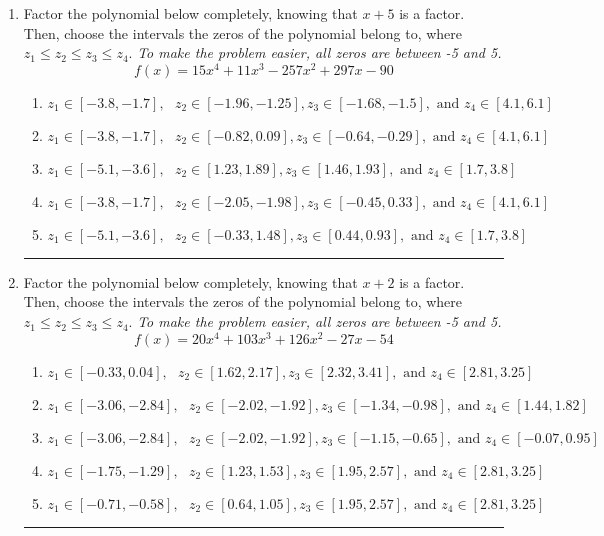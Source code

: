 \documentclass[14pt]{extbook}
\newcommand{\litem}[1]{\item#1\hspace*{-1cm}\rule{\textwidth}{0.4pt}}
\begin{document}
\begin{enumerate}
{\begin{enumerate}[label=\Alph*.]
\end{enumerate} }
\litem{
Factor the polynomial below completely, knowing that $x + 5$ is a factor. Then, choose the intervals the zeros of the polynomial belong to, where $z_1 \leq z_2 \leq z_3 \leq z_4$. \textit{To make the problem easier, all zeros are between -5 and 5.}\[ f(x) = 15x^{4} +11 x^{3} -257 x^{2} +297 x -90 \]\begin{enumerate}[label=\Alph*.]
\item \( z_1 \in [-3.8, -1.7], \text{   }  z_2 \in [-1.96, -1.25], z_3 \in [-1.68, -1.5], \text{   and   } z_4 \in [4.1, 6.1] \)
\item \( z_1 \in [-3.8, -1.7], \text{   }  z_2 \in [-0.82, 0.09], z_3 \in [-0.64, -0.29], \text{   and   } z_4 \in [4.1, 6.1] \)
\item \( z_1 \in [-5.1, -3.6], \text{   }  z_2 \in [1.23, 1.89], z_3 \in [1.46, 1.93], \text{   and   } z_4 \in [1.7, 3.8] \)
\item \( z_1 \in [-3.8, -1.7], \text{   }  z_2 \in [-2.05, -1.98], z_3 \in [-0.45, 0.33], \text{   and   } z_4 \in [4.1, 6.1] \)
\item \( z_1 \in [-5.1, -3.6], \text{   }  z_2 \in [-0.33, 1.48], z_3 \in [0.44, 0.93], \text{   and   } z_4 \in [1.7, 3.8] \)

\end{enumerate} }
\litem{
Factor the polynomial below completely, knowing that $x + 2$ is a factor. Then, choose the intervals the zeros of the polynomial belong to, where $z_1 \leq z_2 \leq z_3 \leq z_4$. \textit{To make the problem easier, all zeros are between -5 and 5.}\[ f(x) = 20x^{4} +103 x^{3} +126 x^{2} -27 x -54 \]\begin{enumerate}[label=\Alph*.]
\item \( z_1 \in [-0.33, 0.04], \text{   }  z_2 \in [1.62, 2.17], z_3 \in [2.32, 3.41], \text{   and   } z_4 \in [2.81, 3.25] \)
\item \( z_1 \in [-3.06, -2.84], \text{   }  z_2 \in [-2.02, -1.92], z_3 \in [-1.34, -0.98], \text{   and   } z_4 \in [1.44, 1.82] \)
\item \( z_1 \in [-3.06, -2.84], \text{   }  z_2 \in [-2.02, -1.92], z_3 \in [-1.15, -0.65], \text{   and   } z_4 \in [-0.07, 0.95] \)
\item \( z_1 \in [-1.75, -1.29], \text{   }  z_2 \in [1.23, 1.53], z_3 \in [1.95, 2.57], \text{   and   } z_4 \in [2.81, 3.25] \)
\item \( z_1 \in [-0.71, -0.58], \text{   }  z_2 \in [0.64, 1.05], z_3 \in [1.95, 2.57], \text{   and   } z_4 \in [2.81, 3.25] \)


\end{enumerate}}
\end{enumerate}
\end{document}
